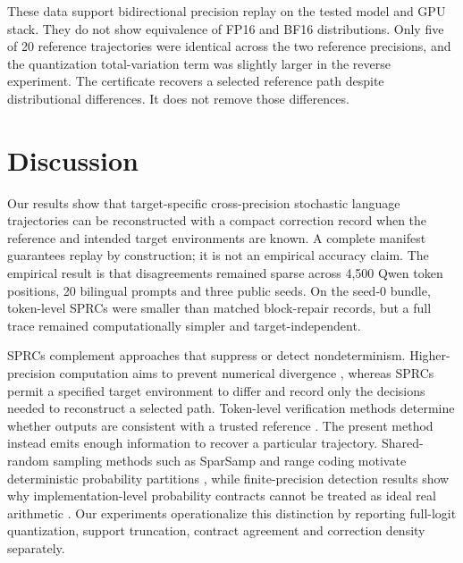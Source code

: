 \documentclass{nature}
\begin{document}
These data support bidirectional precision replay on the tested model and GPU stack. They do not show equivalence of FP16 and BF16 distributions. Only five of 20 reference trajectories were identical across the two reference precisions, and the quantization total-variation term was slightly larger in the reverse experiment. The certificate recovers a selected reference path despite distributional differences. It does not remove those differences.

\section*{Discussion}

Our results show that target-specific cross-precision stochastic language trajectories can be reconstructed with a compact correction record when the reference and intended target environments are known. A complete manifest guarantees replay by construction; it is not an empirical accuracy claim. The empirical result is that disagreements remained sparse across 4,500 Qwen token positions, 20 bilingual prompts and three public seeds. On the seed-0 bundle, token-level SPRCs were smaller than matched block-repair records, but a full trace remained computationally simpler and target-independent.

SPRCs complement approaches that suppress or detect nondeterminism. Higher-precision computation aims to prevent numerical divergence \cite{ref1}, whereas SPRCs permit a specified target environment to differ and record only the decisions needed to reconstruct a selected path. Token-level verification methods determine whether outputs are consistent with a trusted reference \cite{ref2}. The present method instead emits enough information to recover a particular trajectory. Shared-random sampling methods such as SparSamp and range coding motivate deterministic probability partitions \cite{ref3,ref4}, while finite-precision detection results show why implementation-level probability contracts cannot be treated as ideal real arithmetic \cite{ref5}. Our experiments operationalize this distinction by reporting full-logit quantization, support truncation, contract agreement and correction density separately.
\end{document}
